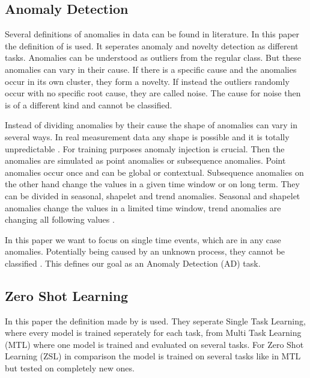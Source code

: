\subsection{Anomaly Detection}
Several definitions of anomalies in data can be found in literature. In this paper the definition of  is used. It seperates anomaly and novelty detection as different tasks. Anomalies can be understood as outliers from the regular class. But these anomalies can vary in their cause. If there is a specific cause and the anomalies occur in its own cluster, they form a novelty. If instead the outliers randomly occur with no specific root cause, they are called noise. The cause for noise then is of a different kind and cannot be classified.

Instead of dividing anomalies by their cause the shape of anomalies can vary in several ways. In real measurement data any shape is possible and it is totally unpredictable . For training purposes anomaly injection is crucial. Then the anomalies are simulated as point anomalies or subsequence anomalies. Point anomalies occur once and can be global or contextual. Subsequence anomalies on the other hand change the values in a given time window or on long term. They can be divided in seasonal, shapelet and trend anomalies. Seasonal and shapelet anomalies change the values in a limited time window, trend anomalies are changing all following values . %

In this paper we want to focus on single time events, which are in any case anomalies. Potentially being caused by an unknown process, they cannot be classified . This defines our goal as an Anomaly Detection (AD) task.

\subsection{Zero Shot Learning}
In this paper the definition made by  is used. They seperate Single Task Learning, where every model is trained seperately for each task, from Multi Task Learning (MTL) where one model is trained and evaluated on several tasks. For Zero Shot Learning (ZSL) in comparison the model is trained on several tasks like in MTL but tested on completely new ones.

